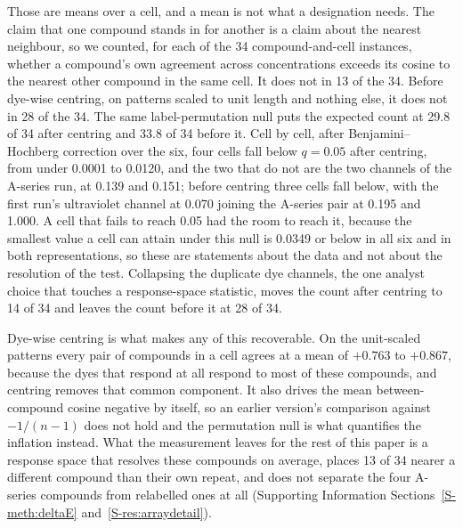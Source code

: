 \documentclass[journal=jacsat,manuscript=article,margin=1in]{achemso}
\begin{document}
Those are means over a cell, and a mean is not what a designation needs. The
claim that one compound stands in for another is a claim about the nearest
neighbour, so we counted, for each of the 34 compound-and-cell instances,
whether a compound's own agreement across concentrations exceeds its cosine to
the nearest other compound in the same cell. It does not in 13 of the 34.
Before dye-wise centring, on patterns scaled to unit length and nothing else,
it does not in 28 of the 34. The same label-permutation null puts the expected
count at 29.8 of 34 after centring and 33.8 of 34 before it. Cell by cell,
after Benjamini--Hochberg correction over the six, four cells fall below
$q = 0.05$ after centring, from under 0.0001 to 0.0120, and the two that do not
are the two channels of the A-series run, at 0.139 and 0.151; before centring
three cells fall below, with the first run's ultraviolet channel at 0.070
joining the A-series pair at 0.195 and 1.000. A cell that fails to reach 0.05
had the room to reach it, because the smallest value a cell can attain under
this null is 0.0349 or below in all six and in both representations, so these
are statements about the data and not about the resolution of the test.
Collapsing the duplicate dye channels, the one analyst choice that touches a
response-space statistic, moves the count after centring to 14 of 34 and leaves
the count before it at 28 of 34.

Dye-wise centring is what makes any of this recoverable. On the unit-scaled
patterns every pair of compounds in a cell agrees at a mean of $+0.763$ to
$+0.867$, because the dyes that respond at all respond to most of these
compounds, and centring removes that common component. It also drives the mean
between-compound cosine negative by itself, so an earlier version's comparison
against $-1/(n-1)$ does not hold and the permutation null is what quantifies
the inflation instead. What the measurement leaves for the rest of this paper
is a response space that resolves these compounds on average, places 13 of 34
nearer a different compound than their own repeat, and does not separate the
four A-series compounds from relabelled ones at all (Supporting Information
Sections~\ref{S-meth:deltaE} and~\ref{S-res:arraydetail}).

\end{document}
